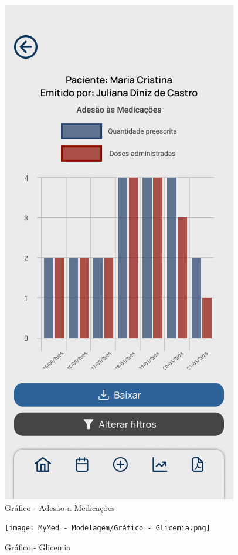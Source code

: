 \begin{figure}
	\centering
	\includegraphics[width=0.6\linewidth]{MyMed - Modelagem/Gráfico - Adesão a Medicações.png}
	\caption{Gráfico - Adesão a Medicações}
	\label{grafico_adesao_medicacoes}
\end{figure}

\begin{figure}
	\centering
	\texttt{[image: MyMed - Modelagem/Gráfico - Glicemia.png]}
	\caption{Gráfico - Glicemia}
	\label{grafico_glicemia}
\end{figure}

